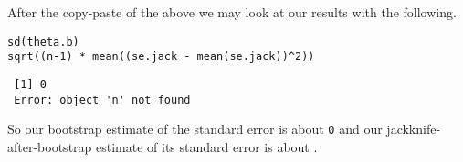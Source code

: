 \documentclass[11pt,english]{article}
\begin{document}
After the copy-paste of the above we may look at our results with the following.

\begin{verbatim}
sd(theta.b)
sqrt((n-1) * mean((se.jack - mean(se.jack))^2))
\end{verbatim}




\begin{verbatim}
 [1] 0
 Error: object 'n' not found
\end{verbatim}


So our bootstrap estimate of the standard error is about  \texttt{0} and our jackknife-after-bootstrap estimate of its standard error is about 
.
\end{document}
